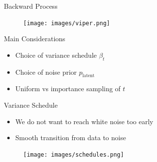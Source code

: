 \documentclass{beamer}
\begin{document}


\begin{frame}{Backward Process}

    \begin{figure}[H]
        \centering
        \texttt{[image: images/viper.png]}
    \end{figure}

\end{frame}





 



\begin{frame}{Main Considerations}

    \begin{itemize}
        \setlength\itemsep{1.5em}
        \item Choice of variance schedule $\beta_t$
        \pause
        \item Choice of noise prior $p_{\text{latent}}$
        \pause
        \item Uniform vs importance sampling of $t$
    \end{itemize}

\end{frame}


\begin{frame}{Variance Schedule}

    \begin{itemize}
        \item We do not want to reach white noise too early
        \item Smooth transition from data to noise
    \end{itemize}

    \begin{figure}[H]
        \centering
        \texttt{[image: images/schedules.png]}
    \end{figure} 

\end{frame}
\end{document}
